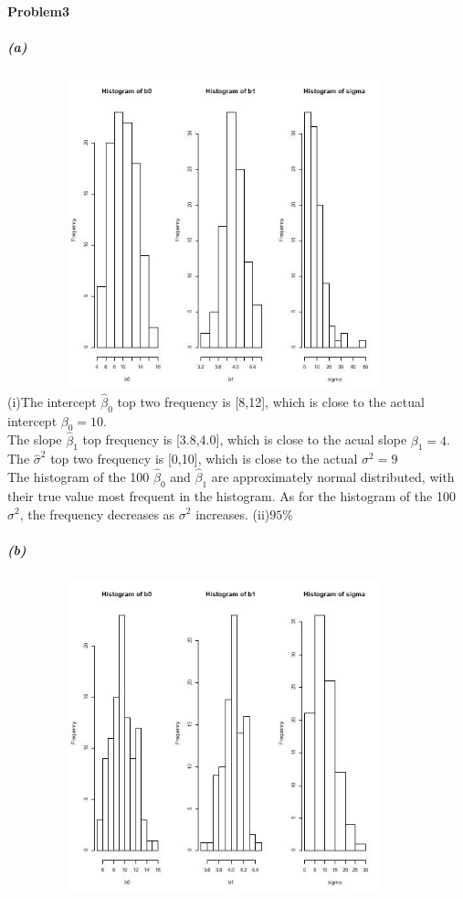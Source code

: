 \documentclass{article}
\begin{document}
\paragraph{Problem3}
\subparagraph{(a)}~{}
\newline
\includegraphics[height=9cm,width=12cm]{31.jpg}
\newline
(i)The intercept $\hat{\beta}_0$ top two frequency is [8,12], which is close to the actual intercept $\beta_0=10$.\\
The slope $\hat{\beta}_1$ top frequency is [3.8,4.0], which is close to the acual slope $\beta_1=4$.\\
The $\hat{\sigma}^2$ top two frequency is [0,10], which is close to the actual $\sigma^2=9$\\
The histogram of the 100  $\hat{\beta}_0$ and $\hat{\beta}_1$ are approximately normal distributed, with their true value most frequent in the histogram. As for the histogram of the 100  $\sigma^2$, the frequency decreases as $\sigma^2$ increases.
(ii)$95\%$
\subparagraph{(b)}~{}
\newline
\includegraphics[height=9cm,width=12cm]{32.jpg}
\end{document}

